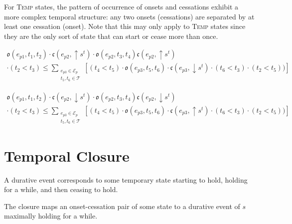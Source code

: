 For \textsc{Temp} states, the pattern of occurrence of onsets and cessations exhibit a more complex temporal
structure: any two onsets (cessations) are separated by at least one cessation (onset). Note that this
may only apply to \textsc{Temp} states since they are the only sort of state that can start or cease more
than once.

\begin{theorem}
    \begin{equation}
        \begin{gathered}
            \mathfrak{o}(e_{p1}, t_1, t_2) \cdot \mathfrak{c}(e_{p2}, \uparrow s^{t}) \cdot \mathfrak{o}(e_{p2}, t_3, t_4) \mathfrak{c}(e_{p2}, \uparrow s^{t}) \\
            \cdot (t_2 < t_3) \leq \sum_{\substack{e_{p3} \in \mathcal{E}_p \\ t_5, t_6 \in \mathcal{T}}}[(t_4 < t_5) \cdot \mathfrak{o}(e_{p3}, t_5, t_6)
                \cdot \mathfrak{c}(e_{p3}, \downarrow s^{t}) \cdot (t_6 < t_3) \cdot (t_2 < t_5))]
        \end{gathered}
    \end{equation}
\end{theorem}

\begin{theorem}
    \begin{equation}
        \begin{gathered}
            \mathfrak{o}(e_{p1}, t_1, t_2) \cdot \mathfrak{c}(e_{p2}, \downarrow s^{t}) \cdot \mathfrak{o}(e_{p2}, t_3, t_4) \mathfrak{c}(e_{p2}, \downarrow s^{t}) \\
            \cdot (t_2 < t_3) \leq \sum_{\substack{e_{p3} \in \mathcal{E}_p \\ t_5, t_6 \in \mathcal{T}}}[(t_4 < t_5) \cdot \mathfrak{o}(e_{p3}, t_5, t_6)
                \cdot \mathfrak{c}(e_{p3}, \uparrow s^{t}) \cdot (t_6 < t_3) \cdot (t_2 < t_5))]
        \end{gathered}
    \end{equation}
\end{theorem}

\section{Temporal Closure}
A durative event corresponds to some temporary state starting to hold, holding for a while, and
then ceasing to hold.

The closure maps an onset-cessation pair of some state to a durative event of $s$ maximally holding for a while.


